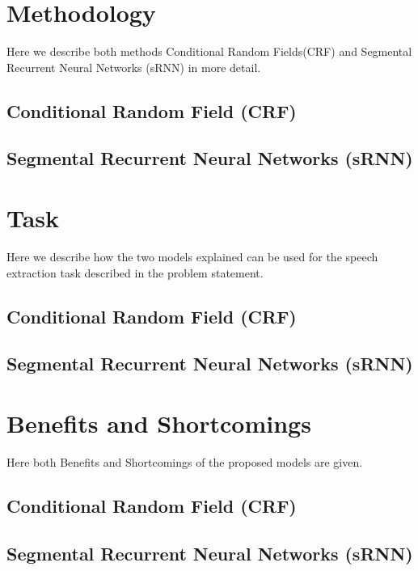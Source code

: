 \documentclass[letterpaper]{article} %
\begin{document}
\section{Methodology}
Here we describe both methods Conditional Random Fields(CRF) \cite{Lafferty:2001:CRF:645530.655813} and Segmental Recurrent Neural Networks (sRNN) \cite{DBLP:journals/corr/KongDS15} in more detail.
\subsection{Conditional Random Field (CRF)}
\subsection{Segmental Recurrent Neural Networks (sRNN)}

\section{Task}
Here we describe how the two models explained can be used for the speech extraction task described in the problem statement.
\subsection{Conditional Random Field (CRF)}
\subsection{Segmental Recurrent Neural Networks (sRNN)}

\section{Benefits and Shortcomings}
Here both Benefits and Shortcomings of the proposed models are given.
\subsection{Conditional Random Field (CRF)}
\subsection{Segmental Recurrent Neural Networks (sRNN)}



\end{document}
